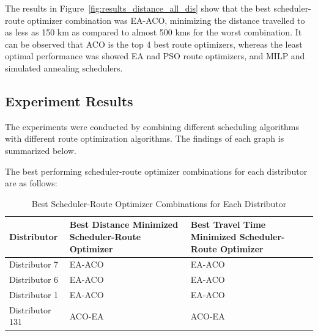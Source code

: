 The results in Figure~\ref{fig:results_distance_all_dis} show that the best scheduler-route optimizer combination was EA-ACO, minimizing the distance travelled to as less as 150 km as compared to almost 500 kms for the worst combination. 
It can be observed that ACO is the top 4 best route optimizers, whereas the least optimal performance was showed EA nad PSO route optimizers, and MILP and simulated annealing schedulers.


\subsection{Experiment Results}
The experiments were conducted by combining different scheduling algorithms with different route optimization algorithms. The findings of each graph is summarized below.



The best performing scheduler-route optimizer combinations for each distributor are as follows:

\begin{table}[h!]
\centering
\begin{tabular}{|l|l|l|}
    \hline
    \textbf{Distributor} & \textbf{Best Distance Minimized Scheduler-Route Optimizer} & \textbf{Best Travel Time Minimized Scheduler-Route Optimizer} \\
    \hline
    Distributor 7 & EA-ACO & EA-ACO \\
    Distributor 6 & EA-ACO & EA-ACO \\
    Distributor 1 & EA-ACO & EA-ACO \\
    Distributor 131 & ACO-EA & ACO-EA \\
    \hline
    
\end{tabular}
\caption{Best Scheduler-Route Optimizer Combinations for Each Distributor}
\end{table}

